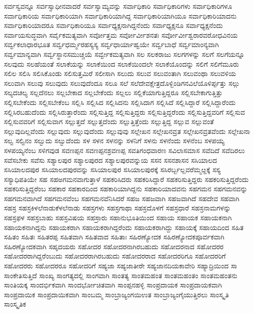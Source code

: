 {ಸರ್ವಸ್ವವನ್ನೂ
ಸರ್ವಸ್ವಾಧೀನವಾದರೆ
ಸರ್ವಸ್ವಾಮ್ಯವನ್ನು
ಸರ್ವಾಧಿಕಾರಿ
ಸರ್ವಾಧಿಕಾರಿಗಳು
ಸರ್ವಾಧಿಕಾರಿಗಳೂ
ಸರ್ವಾಧಿಕಾರಿಯ
ಸರ್ವಾಧಿಕಾರಿಯಾಗಿ
ಸರ್ವಾಧಿಕಾರಿಯಾಗಿದ್ದ
ಸರ್ವಾಧಿಕಾರಿಯಾಗಿಯೂ
ಸರ್ವಾಧಿಕಾರಿಯಾದನು
ಸರ್ವಾಧಿಕಾರಿಯಾದರೂ
ಸರ್ವಾಧಿಕಾರಿಯೂ
ಸರ್ವಾಧ್ಯಕ್ಷನಾಗಿದ್ದನೆಂದು
ಸರ್ವಾಧ್ಯಕ್ಷನೂ
ಸರ್ವಾಧ್ಯಕ್ಷನೆಂದು
ಸರ್ವಾಯಸುದ್ಧವಾಗಿ
ಸರ್ವೈಕಮತ್ಯವಾಗಿ
ಸರ್ವೋತ್ತಮ
ಸರ್ವೋರ್ವೀಶನತಃ
ಸರ್ವೋರ್ವೀಶ್ವರಾರವರೋಧವಿನಯ
ಸರ್ವ್ವಕಲಾಧಾರಭೂತ
ಸರ್ವ್ವಧರ್ಮ್ಮರಹಸ್ಯಸ್ಯ
ಸರ್ವ್ವಧಾರ್ಯಾಹ್ವಯೇ
ಸರ್ವ್ವಬಾಧೆ
ಸರ್ವ್ವಮಾಂನ್ಯವಾಗಿ
ಸರ್ವ್ವಮಾನ್ಯವಾಗಿ
ಸರ್ವ್ವಸ್ಥಾನಸಮುಚ್ಚಯೆ
ಸರ್ವ್ವೇಕಮತ್ಯವಾಗಿ
ಸಲ
ಸಲಕರಾಜು
ಸಲಗಗಳನ್ನು
ಸಲಗೆ
ಸಲಗೆಯನ್ನೂ
ಸಲವುದು
ಸಲಹೆಯಂತೆ
ಸಲಾಕೆಯನ್ನು
ಸಲಾಕೆಯಿಂದ
ಸಲಾಕೆಯಿಂದಲೇ
ಸಲಾಕೆಯೊಂದನ್ನು
ಸಲಿಗೆ
ಸಲಿಗೆಮೂರು
ಸಲಿಲ
ಸಲಿಸಿ
ಸಲಿಸಿಕೊಂಡು
ಸಲಿಸುತ್ತಮಿರೆ
ಸಲೀಸಾಗಿ
ಸಲುದು
ಸಲುವ
ಸಲುವಂತಾಗಿ
ಸಲುವಂಥಾ
ಸಲುವಳಿಯ
ಸಲುವಾಗಿ
ಸಲುವು
ಸಲುವುದು
ಸಲುವುದೆಂದೂ
ಸಲೂ
ಸಲೆ
ಸಲೆದೇವಕ್ಷೇತ್ರದೊಳ್ಬಿಂಡಿಗನವಿಲೆಯೊಳಿರ್ಪ್ಪತ್ತು
ಸಲ್ಗು
ಸಲ್ಯದಚಲ್ಯ
ಸಲ್ಲದೆನಲು
ಸಲ್ಲಬೇಕಾದ
ಸಲ್ಲಬೇಕೆಂದು
ಸಲ್ಲಲು
ಸಲ್ಲಿಕೆಯಾಗುತ್ತಿದ್ದರೂ
ಸಲ್ಲಿಸಬೇಕಾಗುತ್ತಿತ್ತು
ಸಲ್ಲಿಸಬೇಕೆಂದು
ಸಲ್ಲಿಸಬೇಕೆಂಬ
ಸಲ್ಲಿಸಿ
ಸಲ್ಲಿಸಿದ
ಸಲ್ಲಿಸಿದನು
ಸಲ್ಲಿಸಿದಾಗ
ಸಲ್ಲಿಸಿದೆ
ಸಲ್ಲಿಸಿದ್ದಾರೆ
ಸಲ್ಲಿಸಿದ್ದಾರೆಂದು
ಸಲ್ಲಿಸಿರಬಹುದೆಂದು
ಸಲ್ಲಿಸಿರುತ್ತಾರೆಂದು
ಸಲ್ಲಿಸುತ್ತಿದ್ದ
ಸಲ್ಲಿಸುತ್ತಿದ್ದರು
ಸಲ್ಲಿಸುತ್ತಿದ್ದರೆಂದು
ಸಲ್ಲಿಸುತ್ತಿದ್ದವರಿಗೆ
ಸಲ್ಲಿಸುವ
ಸಲ್ಲಿಸುವವರಿಗೆ
ಸಲ್ಲಿಸುವಾಗ
ಸಲ್ಲುತ್ತದೆ
ಸಲ್ಲುತ್ತದೆಂದು
ಸಲ್ಲುತ್ತಿತ್ತೆಂದು
ಸಲ್ಲುತ್ತಿದ್ದ
ಸಲ್ಲುವ
ಸಲ್ಲುವಂತೆ
ಸಲ್ಲುವುದಿಲ್ಲವೆಂದು
ಸಲ್ಲುವುದು
ಸಲ್ಲುವುದೆಂದು
ಸಲ್ಲುವುವು
ಸಲ್ಲೇಖನ
ಸಲ್ಲೇಖನವ್ರತ
ಸಲ್ಲೇಖನವ್ರತವೆಂದು
ಸಲ್ಲೇಖನಾ
ಸಲ್ವ
ಸಲ್ವಿನಂ
ಸಲ್ವುದು
ಸಲ್ವುದೆಂದು
ಸಳ
ಸಳನ
ಸಳನನ್ನು
ಸಳನಿಗೆ
ಸಳನು
ಸಳನೆಂದು
ಸಳನೆಂಬ
ಸಳಪಯ್ಯ
ಸಳಪಯ್ಯನೆಂಬ
ಸಳಿಗವುಡ
ಸವಣಪ್ಪನ
ಸವಣಪ್ಪನಶ್ರವಣಪ್ಪ
ಸವತಿಗಂಧವಾರಣ
ಸವಿಲಾಸಮಾಸ
ಸವೆದಿದೆ
ಸವೆದಿರಲು
ಸವೆಸಬೇಕು
ಸವೆಸು
ಸಶ್ಯಾಲಪುರ
ಸಶ್ಯಾಲಪುರದ
ಸಶ್ಯಾಲಪುರವನ್ನುಯ
ಸಸನ
ಸಸನಶಾಸನ
ಸಸಿಯಾಲದ
ಸಸಿಯಾಲದಪುರ
ಸಸಿಯಾಲದಪುರವನ್ನು
ಸಸಿಯಾಲಪುರ
ಸಸಿಯಾಲಪುರಕ್ಕೆ
ಸಸಿರರ್ಬ್ಬಲ್ಲವರೆಮ್ಮೞ್ದಕ್ಕೆ
ಸಸ್ಯ
ಸಸ್ಯಾಧಿಪತಿಯೇ
ಸಹ
ಸಹಅಗಮನವಾಗುತ್ತಾಳೆ
ಸಹಕರಿಸಿದರು
ಸಹಕರಿಸಿದ್ದಾರೆ
ಸಹಕರಿಸುತ್ತಿದ್ದರು
ಸಹಕರಿಸುತ್ತಿದ್ದರೆಂದು
ಸಹಕರಿಸುತ್ತಿದ್ದರೆಂಬ
ಸಹಕಾರ
ಸಹಕಾರದಿಂದ
ಸಹಕಾರಿಯಾಗಿದ್ದನು
ಸಹಕಾರಿಯಾದವನು
ಸಹಗಮನ
ಸಹಗಮನವನ್ನು
ಸಹಗಮನವಾಗಿದೆ
ಸಹಗಮನವೆಂಬ
ಸಹಗಮನವೆನಿಸಿದರೆ
ಸಹಜ
ಸಹಜವಾಗಿ
ಸಹಜವಾಗಿದೆ
ಸಹದೇವ
ಸಹವಾಗಿ
ಸಹಸ್ರ
ಸಹಸ್ರಕಿಳಲೆನಾಡುಕೆಳಲೆನಾಡು
ಸಹಸ್ರಗಳು
ಸಹಸ್ರಗಾಥಾ
ಸಹಸ್ರದೊಳಗೆ
ಸಹಸ್ರಧಾರೆ
ಸಹಸ್ರನಾಮಗಳನ್ನು
ಸಹಸ್ರಫಳ
ಸಹಸ್ರಬಾಹು
ಸಹಸ್ರವಿಷಯ
ಸಹಸ್ರಾರು
ಸಹಾನುಭೂತಿಯಿಂದ
ಸಹಾಯ
ಸಹಾಯಕ
ಸಹಾಯಕನಾಗಿ
ಸಹಾಯಕನಾಗಿದ್ದನು
ಸಹಾಯಕರಾಗಿ
ಸಹಾಯಕರಾಗಿದ್ದರೆಂದು
ಸಹಾಯಕರಾಗಿದ್ದು
ಸಹಾಯಕ್ಕೆ
ಸಹಾಯದಿಂದ
ಸಹಿತ
ಸಹಿತಂ
ಸಹಿತಃ
ಸಹಿತರಪ್ಪ
ಸಹಿತವಾಗಿ
ಸಹಿತವಾದ
ಸಹಿತಾಃ
ಸಹಿರಣ್ಯೋದಕ
ಸಹಿರಣ್ಯೋದಕಪೂರ್ವಕವಾಗಿ
ಸಹಿರಣ್ಯೋದಕವಾಗಿ
ಸಹೃದಯರು
ಸಹೋದರ
ಸಹೋದರನಾಗಿರಬಹುದು
ಸಹೋದರನಾದ
ಸಹೋದರರ
ಸಹೋದರರಾಗಿದ್ದರೆಂಬುದು
ಸಹೋದರರಾಗಿರಬಹುದು
ಸಹೋದರರಾದ
ಸಹೋದರರಿಗೂ
ಸಹೋದರರಿಗೆ
ಸಹೋದರರು
ಸಹೋದರರೂ
ಸಹೋದರಿಗೆ
ಸಹ್ಯಜಾ
ಸಹ್ಯಜಾತೀರೇ
ಸಹ್ಯಜಾನದಿಯಕಾವೇರಿ
ಸಹ್ಯಾದ್ರಿಯಿಂದ
ಸಾ
ಸಾಂಕೇತಿಸುತ್ತಿದೆ
ಸಾಂಖ್ಯ
ಸಾಂಗತ್ಯದಲ್ಲಿ
ಸಾಂಗವಾಗಿ
ಸಾಂತತ್ಯ
ಸಾಂತಮಹಂತ
ಸಾಂತಮಹಂತಂ
ಸಾಂತಮಹಂತನು
ಸಾಂತಿಯಕ್ಕ
ಸಾಂದರ್ಭಿಕವಾಗಿ
ಸಾಂದರ್ಭೋಚಿತವಾಗಿ
ಸಾಂಪ್ಪನಹಳ್ಳಿ
ಸಾಂಪ್ರದಾಯಕ
ಸಾಂಪ್ರದಾಯಕವಾಗಿ
ಸಾಂಪ್ರದಾಯಿಕ
ಸಾಂಪ್ರದಾಯಿಕವಾಗಿ
ಸಾಂಬಮ್ಮ
ಸಾಂಬ್ರಾಜ್ಯಂಗಯಿಉತ
ಸಾಂಬ್ರಾಜ್ಯಂಗೈಯುತ್ತಿರಲು
ಸಾಂಸ್ಕೃತಿ
ಸಾಂಸ್ಕೃತಿಕ
}

